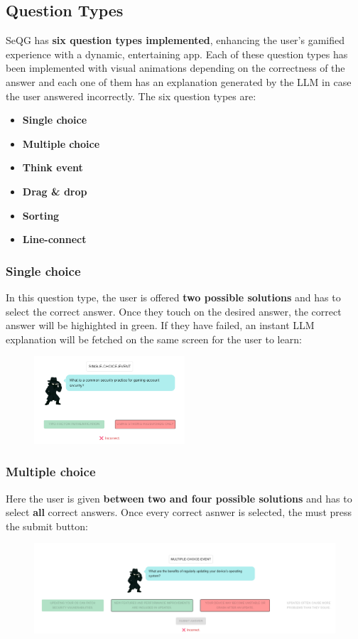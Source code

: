 \subsection{Question Types}
SeQG has \textbf{six question types implemented}, enhancing the user's gamified experience with a dynamic, entertaining
app. Each of these question types has been implemented with visual animations depending on the correctness of
the answer and each one of them has an explanation generated by the LLM in case the user answered incorrectly.
The six question types are:
\begin{itemize}[nosep]
    \item \textbf{Single choice} 
    \item \textbf{Multiple choice} 
    \item \textbf{Think event} 
    \item \textbf{Drag \& drop}
    \item \textbf{Sorting}
    \item \textbf{Line-connect}
\end{itemize}

\pagebreak
\subsubsection{Single choice}
In this question type, the user is offered \textbf{two possible solutions} and has to select the correct answer. Once they
touch on the desired answer, the correct answer will be highighted in green. If they have failed, an instant LLM explanation
will be fetched on the same screen for the user to learn:
\begin{figure}[htbp]
    \centering
    \includegraphics[width=0.5\textwidth]{images/Single_Choice.png}
\end{figure}

\subsubsection{Multiple choice}
Here the user is given \textbf{between two and four possible solutions} and has to select \textbf{all} correct answers. Once every
correct asnwer is selected, the must press the submit button:
\begin{figure}[htbp]
    \centering
    \includegraphics[width=1\textwidth]{images/Multiple_Choice.png}
\end{figure}

